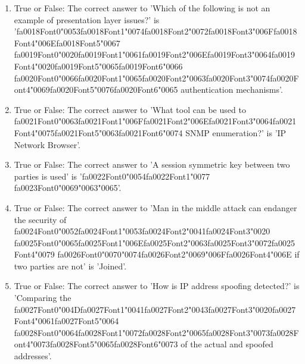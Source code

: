 \documentclass[12pt]{article}
\begin{document}
\begin{enumerate}[label=\arabic*.]
\item True or False: The correct answer to 'Which of the following is not an example of presentation layer issues?' is '{\csname fa0018Font0\endcsname\char"0053}{\csname fa0018Font1\endcsname\char"0074}{\csname fa0018Font2\endcsname\char"0072}{\csname fa0018Font3\endcsname\char"006F}{\csname fa0018Font4\endcsname\char"006E}{\csname fa0018Font5\endcsname\char"0067} {\csname fa0019Font0\endcsname\char"0020}{\csname fa0019Font1\endcsname\char"0061}{\csname fa0019Font2\endcsname\char"006E}{\csname fa0019Font3\endcsname\char"0064}{\csname fa0019Font4\endcsname\char"0020}{\csname fa0019Font5\endcsname\char"0065}{\csname fa0019Font6\endcsname\char"0066} {\csname fa0020Font0\endcsname\char"0066}{\csname fa0020Font1\endcsname\char"0065}{\csname fa0020Font2\endcsname\char"0063}{\csname fa0020Font3\endcsname\char"0074}{\csname fa0020Font4\endcsname\char"0069}{\csname fa0020Font5\endcsname\char"0076}{\csname fa0020Font6\endcsname\char"0065} authentication mechanisms'.
\item True or False: The correct answer to 'What tool can be used to {\csname fa0021Font0\endcsname\char"0063}{\csname fa0021Font1\endcsname\char"006F}{\csname fa0021Font2\endcsname\char"006E}{\csname fa0021Font3\endcsname\char"0064}{\csname fa0021Font4\endcsname\char"0075}{\csname fa0021Font5\endcsname\char"0063}{\csname fa0021Font6\endcsname\char"0074} SNMP enumeration?' is 'IP Network Browser'.
\item True or False: The correct answer to 'A session symmetric key between two parties is used' is '{\csname fa0022Font0\endcsname\char"0054}{\csname fa0022Font1\endcsname\char"0077} {\csname fa0023Font0\endcsname\char"0069}{\char"0063}{\char"0065}'.
\item True or False: The correct answer to 'Man in the middle attack can endanger the security of {\csname fa0024Font0\endcsname\char"0052}{\csname fa0024Font1\endcsname\char"0053}{\csname fa0024Font2\endcsname\char"0041}{\csname fa0024Font3\endcsname\char"0020} {\csname fa0025Font0\endcsname\char"0065}{\csname fa0025Font1\endcsname\char"006E}{\csname fa0025Font2\endcsname\char"0063}{\csname fa0025Font3\endcsname\char"0072}{\csname fa0025Font4\endcsname\char"0079} {\csname fa0026Font0\endcsname\char"0070}{\char"0074}{\csname fa0026Font2\endcsname\char"0069}{\char"006F}{\csname fa0026Font4\endcsname\char"006E} if two parties are not' is 'Joined'.
\item True or False: The correct answer to 'How is IP address spoofing detected?' is 'Comparing the {\csname fa0027Font0\endcsname\char"004D}{\csname fa0027Font1\endcsname\char"0041}{\csname fa0027Font2\endcsname\char"0043}{\csname fa0027Font3\endcsname\char"0020}{\csname fa0027Font4\endcsname\char"0061}{\csname fa0027Font5\endcsname\char"0064} {\csname fa0028Font0\endcsname\char"0064}{\csname fa0028Font1\endcsname\char"0072}{\csname fa0028Font2\endcsname\char"0065}{\csname fa0028Font3\endcsname\char"0073}{\csname fa0028Font4\endcsname\char"0073}{\csname fa0028Font5\endcsname\char"0065}{\csname fa0028Font6\endcsname\char"0073} of the actual and spoofed addresses'.

\end{enumerate}
\end{document}
